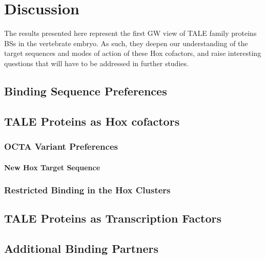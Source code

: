 \chapter{Discussion}
\label{chp:discussion}

The results presented here represent the first \ac{GW} view of \ac{TALE} family proteins \acp{BS} in the vertebrate embryo. As such, they deepen our understanding of the target sequences and modes of action of these Hox cofactors, and raise interesting questions that will have to be addressed in further studies. 

\section{Binding Sequence Preferences}

\section{TALE Proteins as Hox cofactors}

\subsection{OCTA Variant Preferences}

\subsubsection{New Hox Target Sequence}

\subsection{Restricted Binding in the Hox Clusters}

\section{TALE Proteins as Transcription Factors}


\section{Additional Binding Partners}